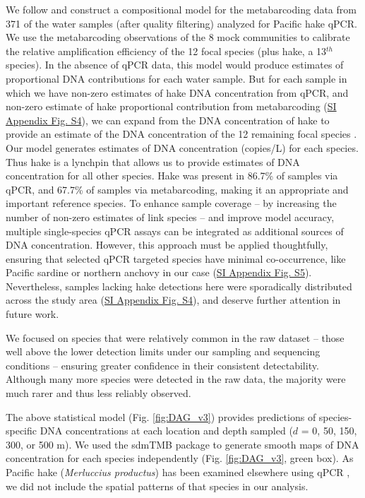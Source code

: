 \documentclass{article}
\begin{document}
We follow \cite{shelton2023} and construct a compositional model for the metabarcoding data from 371 of the water samples (after quality filtering) analyzed for Pacific hake qPCR. We use the metabarcoding observations of the 8 mock communities to calibrate the relative amplification efficiency of the 12 focal species (plus hake, a 13$^{th}$ species). In the absence of qPCR data, this model would produce estimates of proportional DNA contributions for each water sample. But for each sample in which we have non-zero estimates of hake DNA concentration from qPCR, and non-zero estimate of hake proportional contribution from metabarcoding (\href{SI_Appendix.pdf}{SI Appendix Fig. S4}), we can expand from the DNA concentration of hake to provide an estimate of the DNA concentration of the 12 remaining focal species \cite{allan2023}. Our model generates estimates of DNA concentration (copies/L) for each species. Thus hake is a lynchpin that allows us to provide estimates of DNA concentration for all other species. Hake was present in 86.7\% of samples via qPCR, and 67.7\% of samples via metabarcoding, making it an appropriate and important reference species. To enhance sample coverage -- by increasing the number of non-zero estimates of link species -- and improve model accuracy, multiple single-species qPCR assays can be integrated as additional sources of DNA concentration. However, this approach must be applied thoughtfully, ensuring that selected qPCR targeted species have minimal co-occurrence, like Pacific sardine or northern anchovy in our case (\href{SI_Appendix.pdf}{SI Appendix Fig. S5}). Nevertheless, samples lacking hake detections here were sporadically distributed across the study area (\href{SI_Appendix.pdf}{SI Appendix Fig. S4}), and deserve further attention in future work.

We focused on species that were relatively common in the raw dataset – those well above the lower detection limits under our sampling and sequencing conditions – ensuring greater confidence in their consistent detectability. Although many more species were detected in the raw data, the majority were much rarer and thus less reliably observed.

The above statistical model (Fig. \ref{fig:DAG_v3}) provides predictions of species-specific DNA concentrations at each location and depth sampled ($d$ = 0, 50, 150, 300, or 500 m). We used the sdmTMB package \cite{anderson2022} to generate smooth maps of DNA concentration for each species independently (Fig. \ref{fig:DAG_v3}, green box). As Pacific hake (\textit{Merluccius productus}) has been examined elsewhere using qPCR \cite{shelton2022}, we did not include the spatial patterns of that species in our analysis. 
\end{document}
